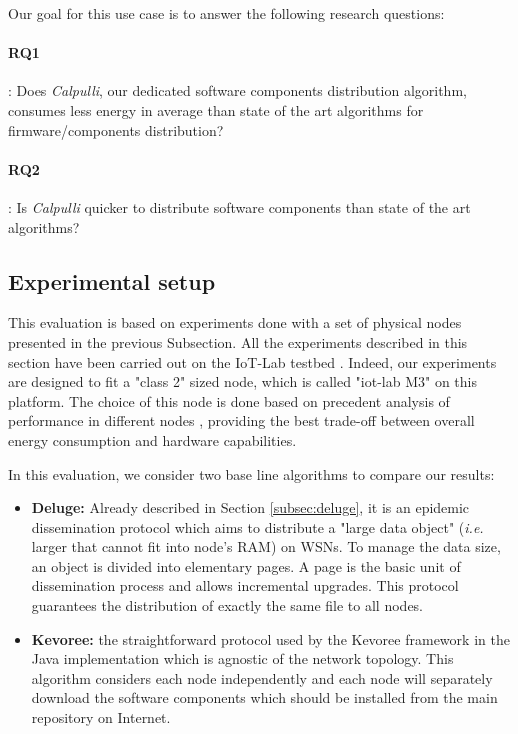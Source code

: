 Our goal for this use case is to answer the following research questions: 
\paragraph{RQ1}: Does \textit{Calpulli}, our dedicated software components distribution algorithm, consumes less energy in average than state of the art algorithms for firmware/components distribution?

\paragraph{RQ2}: Is \textit{Calpulli} quicker to distribute software components than state of the art algorithms?

\subsection{Experimental setup}
This evaluation is based on experiments done with a set of physical nodes presented in the previous Subsection.
All the experiments described in this section have been carried out on the IoT-Lab testbed \cite{Fleury15iotlab}.
Indeed, our experiments are designed to fit a "class 2" sized node, which is called "iot-lab M3" on this platform.
The choice of this node is done based on precedent analysis of performance in different nodes  \cite{tsekoura2014evaluation}, providing the best trade-off between overall energy consumption and hardware capabilities.

In this evaluation, we consider two base line algorithms to compare our results:
\begin{itemize}
	\item \textbf{Deluge:} Already described in Section \ref{subsec:deluge}, it is an epidemic dissemination protocol  \cite{hui2004dynamic} which aims to distribute a "large data object" (\textit{i.e.} larger that cannot fit into node's RAM) on WSNs. To manage the data size, an object is divided into elementary pages. A page is the basic unit of dissemination process and allows incremental upgrades. This protocol guarantees the distribution of exactly the same file to all nodes.
	\item \textbf{Kevoree:} the straightforward protocol used by the Kevoree framework  \cite{fouquet2013kevoree} in the Java implementation which is agnostic of the network topology. 
	This algorithm considers each node independently and each node will separately download the software components which should be installed from the main repository on Internet.
\end{itemize}

